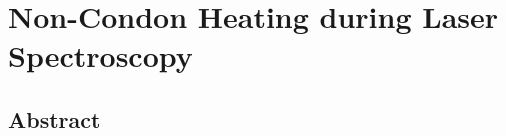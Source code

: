 \chapter{Non-Condon Heating during Laser Spectroscopy}
\thispagestyle{plain}
\vspace{-.5cm}


\section*{Abstract}
    \dsp
    


